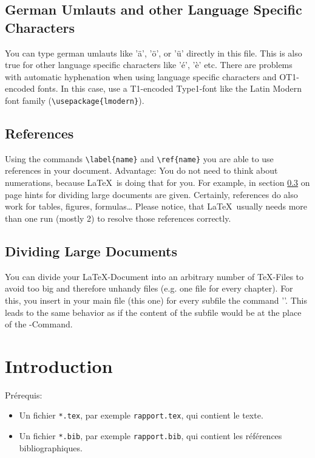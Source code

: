\documentclass{article}
\begin{document}
\subsection{German Umlauts and other Language Specific Characters}
\label{umlauts}
You can type german umlauts like 'ä', 'ö', or 'ü' directly in this file.
This is also true for other language specific characters like 'é', 'è' etc.
There are problems with automatic hyphenation when using language
specific characters and OT1-encoded fonts. In this case, use a
T1-encoded Type1-font like the Latin Modern font family (\verb#\usepackage{lmodern}#).
\subsection{References}
\label{references}
Using the commands \verb#\label{name}# and \verb#\ref{name}# you are able
to use references in your document. Advantage: You do not need to think
about numerations, because \LaTeX\ is doing that for you.
For example, in section \ref{dividing} on page \pageref{dividing} hints for
dividing large documents are given.
Certainly, references do also work for tables, figures, formulas\ldots
Please notice, that \LaTeX\ usually needs more than one run (mostly 2) to
resolve those references correctly.
\subsection{Dividing Large Documents}
\label{dividing}
You can divide your \LaTeX-Document into an arbitrary number of \TeX-Files
to avoid too big and therefore unhandy files (e.g. one file for every chapter).
For this, you insert in your main file (this one) for every subfile
the command '\verb##'. This leads to the same behavior
as if the content of the subfile would be at the place of the
\verb##-Command.


\appendix
\section{Introduction}\label{sec:intro}

Prérequis:
\begin{itemize}
\item Un fichier \texttt{*.tex}, par exemple \texttt{rapport.tex}, qui
  contient le texte.
\item Un fichier \texttt{*.bib}, par exemple \texttt{rapport.bib}, qui
  contient les références bibliographiques.
\end{itemize}
\end{document}

